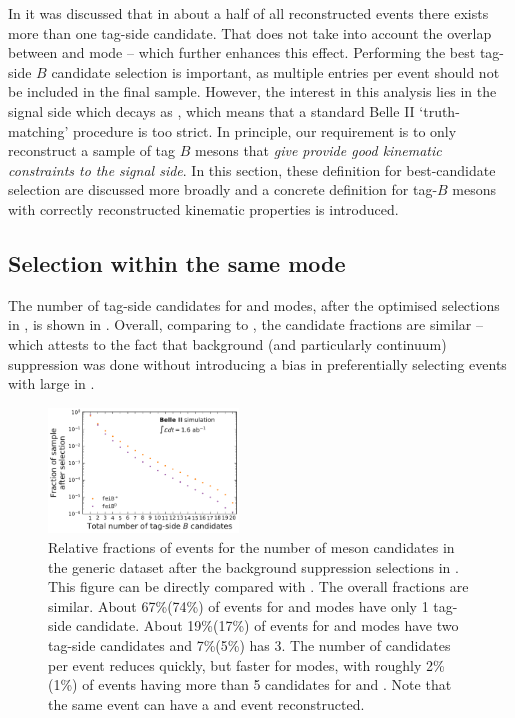 In  it was discussed that in about a half of all reconstructed events there exists more than one tag-side candidate.
That does not take into account the overlap between \feiBp and \feiBz mode -- which further enhances this effect.
Performing the best tag-side $B$ candidate selection is important, as multiple entries per event should not be included in the final sample.
However, the interest in this analysis lies in the signal side which decays as \BtoXsgamma, which means that a standard Belle II `truth-matching' procedure is too strict.
In principle, our requirement is to only reconstruct a sample of tag $B$ mesons that \textit{give provide good kinematic constraints to the signal side}.
In this section, these definition for best-candidate selection are discussed more broadly and
 a concrete definition for tag-$B$ mesons with correctly reconstructed kinematic properties is introduced.

\subsection{Selection within the same \texorpdfstring{\FEI}{FEI} mode}

The number of tag-side candidates for \feiBp and \feiBz modes, after the optimised selections in ,
is shown in .
Overall, comparing to , the candidate fractions are similar --
which attests to the fact that background (and particularly continuum) suppression was done without introducing a bias in preferentially selecting events with large \feiProb in .

\begin{figure}[htbp!]
    \centering
    \includegraphics[width=0.45\textwidth]{figures/event_reconstruction/Bboth_total_tag_candidates.pdf}

    \caption{\label{fig:fei_tag_reco_candidates_post_optimisation} 
    Relative fractions of events for the number of \B meson candidates in the generic \MC dataset after the background suppression selections in .
    This figure can be directly compared with .
    The overall fractions are similar.
    About 67\%(74\%) of events for \Bp and \Bz \FEI modes have only 1 tag-side candidate.
    About 19\%(17\%) of events for \Bp and \Bz \FEI modes have two tag-side candidates and 7\%(5\%) has 3.
    The number of candidates per event reduces quickly, but faster for \Bz modes, with roughly 2\%(1\%) of events having more than 5 candidates for \Bp and \Bz.
    Note that the same event can have a \Bp and \Bz event reconstructed.
    }
\end{figure}

